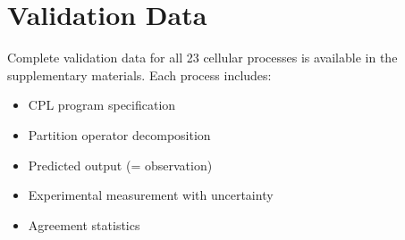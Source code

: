 \documentclass[aps,prd,twocolumn,superscriptaddress,floatfix,nofootinbib]{revtex4-2}
\theoremstyle{remark}
\begin{document}
\section{Validation Data}
\label{app:validation}

Complete validation data for all 23 cellular processes is available in the supplementary materials. Each process includes:
\begin{itemize}
\item CPL program specification
\item Partition operator decomposition
\item Predicted output (= observation)
\item Experimental measurement with uncertainty
\item Agreement statistics
\end{itemize}
\end{document}
